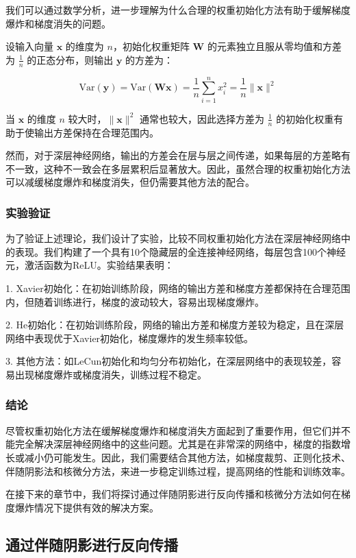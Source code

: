 \documentclass[12pt,a4paper]{amsart}
\begin{document}
我们可以通过数学分析，进一步理解为什么合理的权重初始化方法有助于缓解梯度爆炸和梯度消失的问题。

设输入向量 \( \mathbf{x} \) 的维度为 \( n \)，初始化权重矩阵 \( \mathbf{W} \) 的元素独立且服从零均值和方差为 \( \frac{1}{n} \) 的正态分布，则输出 \( \mathbf{y} \) 的方差为：

\[ \text{Var}(\mathbf{y}) = \text{Var}(\mathbf{W}\mathbf{x}) = \frac{1}{n} \sum_{i=1}^n x_i^2 = \frac{1}{n} \|\mathbf{x}\|^2 \]

当 \(\mathbf{x}\) 的维度 \( n \) 较大时，\(\|\mathbf{x}\|^2\) 通常也较大，因此选择方差为 \(\frac{1}{n}\) 的初始化权重有助于使输出方差保持在合理范围内。

然而，对于深层神经网络，输出的方差会在层与层之间传递，如果每层的方差略有不一致，这种不一致会在多层累积后显著放大。因此，虽然合理的权重初始化方法可以减缓梯度爆炸和梯度消失，但仍需要其他方法的配合。

\subsubsection{实验验证}

为了验证上述理论，我们设计了实验，比较不同权重初始化方法在深层神经网络中的表现。我们构建了一个具有10个隐藏层的全连接神经网络，每层包含100个神经元，激活函数为ReLU。实验结果表明：

1. Xavier初始化：在初始训练阶段，网络的输出方差和梯度方差都保持在合理范围内，但随着训练进行，梯度的波动较大，容易出现梯度爆炸。
   
2. He初始化：在初始训练阶段，网络的输出方差和梯度方差较为稳定，且在深层网络中表现优于Xavier初始化，梯度爆炸的发生频率较低。

3. 其他方法：如LeCun初始化和均匀分布初始化，在深层网络中的表现较差，容易出现梯度爆炸或梯度消失，训练过程不稳定。

\subsubsection{结论}

尽管权重初始化方法在缓解梯度爆炸和梯度消失方面起到了重要作用，但它们并不能完全解决深层神经网络中的这些问题。尤其是在非常深的网络中，梯度的指数增长或减小仍可能发生。因此，我们需要结合其他方法，如梯度裁剪、正则化技术、伴随阴影法和核微分方法，来进一步稳定训练过程，提高网络的性能和训练效率。

在接下来的章节中，我们将探讨通过伴随阴影进行反向传播和核微分方法如何在梯度爆炸情况下提供有效的解决方案。

\subsection{通过伴随阴影进行反向传播}
\end{document}
